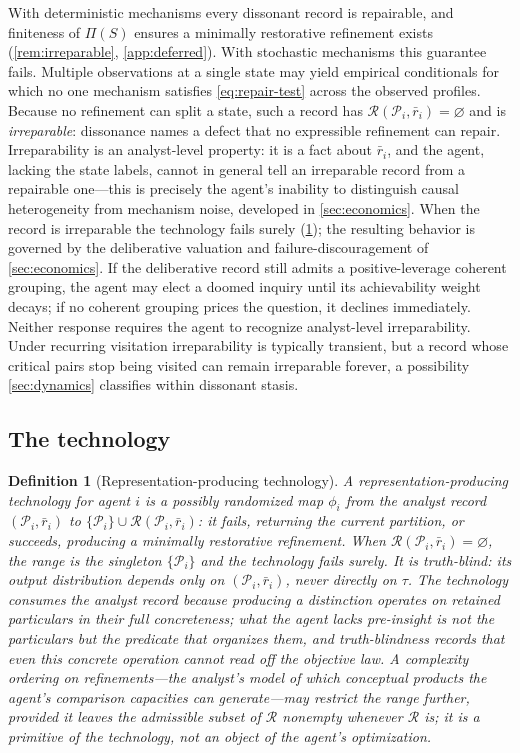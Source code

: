 \documentclass[11pt]{article}
\newtheorem{definition}[assumption]{Definition}
\theoremstyle{definition}
\newcommand{\emptysetset}{\varnothing}
\begin{document}
With deterministic mechanisms every dissonant record is repairable, and finiteness of $\Pi(S)$ ensures a minimally restorative refinement exists (\cref{rem:irreparable}, \cref{app:deferred}).
With stochastic mechanisms this guarantee fails.
Multiple observations at a single state may yield empirical conditionals for which no one mechanism satisfies \cref{eq:repair-test} across the observed profiles.
Because no refinement can split a state, such a record has $\mathcal R(\mathcal P_i,\bar r_i)=\emptysetset$ and is \emph{irreparable}: dissonance names a defect that no expressible refinement can repair.
Irreparability is an analyst-level property: it is a fact about $\bar r_i$, and the agent, lacking the state labels, cannot in general tell an irreparable record from a repairable one---this is precisely the agent's inability to distinguish causal heterogeneity from mechanism noise, developed in \cref{sec:economics}.
When the record is irreparable the technology fails surely (\cref{def:technology}); the resulting behavior is governed by the deliberative valuation and failure-discouragement of \cref{sec:economics}.
If the deliberative record still admits a positive-leverage coherent grouping, the agent may elect a doomed inquiry until its achievability weight decays; if no coherent grouping prices the question, it declines immediately.
Neither response requires the agent to recognize analyst-level irreparability.
Under recurring visitation irreparability is typically transient, but a record whose critical pairs stop being visited can remain irreparable forever, a possibility \cref{sec:dynamics} classifies within dissonant stasis.

\subsection{The technology}

\begin{definition}[Representation-producing technology]
\label{def:technology}
A representation-producing technology for agent $i$ is a possibly randomized map $\phi_i$ from the analyst record $(\mathcal P_i,\bar r_i)$ to $\{\mathcal P_i\}\cup\mathcal R(\mathcal P_i,\bar r_i)$: it fails, returning the current partition, or succeeds, producing a minimally restorative refinement.
When $\mathcal R(\mathcal P_i,\bar r_i)=\emptysetset$, the range is the singleton $\{\mathcal P_i\}$ and the technology fails surely.
It is \emph{truth-blind}: its output distribution depends only on $(\mathcal P_i,\bar r_i)$, never directly on $\tau$.
The technology consumes the analyst record because producing a distinction operates on retained particulars in their full concreteness; what the agent lacks pre-insight is not the particulars but the predicate that organizes them, and truth-blindness records that even this concrete operation cannot read off the objective law.
A complexity ordering on refinements---the analyst's model of which conceptual products the agent's comparison capacities can generate---may restrict the range further, provided it leaves the admissible subset of $\mathcal R$ nonempty whenever $\mathcal R$ is; it is a primitive of the technology, not an object of the agent's optimization.
\end{definition}
\end{document}
